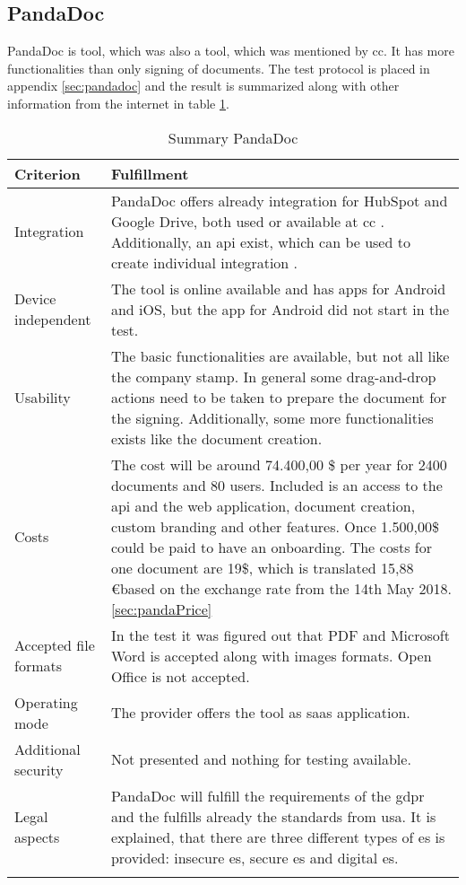 \subsection{PandaDoc}
PandaDoc is tool, which was also a tool, which was mentioned by \gls{cc}. It has more functionalities than only signing of documents. The test protocol is placed in appendix \ref{sec:pandadoc} and the result is summarized along with other information from the internet in table \ref{tab:pandadoc}. 
	\begin{longtable}{|p{4cm}|p{10cm}|} \hline
		\rowcolor{Gray}Criterion & Fulfillment \\ \hline
		Integration & PandaDoc offers already integration for HubSpot and Google Drive, both used or available at \gls{cc} \parencite{pandadoc2018integration}. Additionally, an \gls{api} exist, which can be used to create individual integration \parencite{pandadoc2018api}. \\ \hline
		Device independent & The tool is online available and has \glspl{app} for Android and iOS, but the \gls{app} for Android did not start in the test. \\ \hline
		Usability & The basic functionalities are available, but not all like the company stamp. In general some drag-and-drop actions need to be taken to prepare the document for the signing. Additionally, some more functionalities exists like the document creation.\\ \hline
		Costs & The cost will be around 74.400,00 \$ per year for 2400 documents and 80 users. Included is an access to the \gls{api} and the web application, document creation, custom branding and other features. Once 1.500,00\$ could be paid to have an onboarding. The costs for one document are 19\$, which is translated 15,88 \euro based on the exchange rate from the 14th May 2018. \ref{sec:pandaPrice} \\ \hline
		Accepted file formats & In the test it was figured out that \gls{PDF} and Microsoft Word is accepted along with images formats. Open Office is not accepted. \\ \hline
		Operating mode & The provider offers the tool as \gls{saas} application. \parencite{pandadoc2018saas} \\ \hline
		Additional security & Not presented and nothing for testing available. \\ \hline
		Legal aspects & PandaDoc will fulfill the requirements of the \gls{gdpr} and the fulfills already the standards from \gls{usa}. It is explained, that there are three different types of \gls{es} is provided: insecure \gls{es}, secure \gls{es} and digital \gls{es}.  \parencite{pandadoc2018gdpr,pandadoc2018legal} \\ \hline
	\caption{Summary PandaDoc}
	\label{tab:pandadoc}
	\end{longtable}

